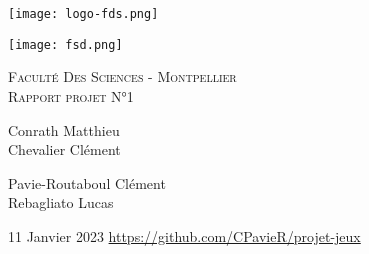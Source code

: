 \documentclass[a4paper, 12pt]{article}
\begin{document}
\begin{titlepage}
  \begin{sffamily}
  \begin{center}
  

\begin{minipage}[c]{.46\linewidth}
     \begin{center}
             \texttt{[image: logo-fds.png]}
         \end{center}
   \end{minipage} \hfill
   \begin{minipage}[c]{.46\linewidth}
    \begin{center}
            \texttt{[image: fsd.png]}
        \end{center}   
 \end{minipage}
 \newline\newline
 
\textsc{\LARGE Faculté Des Sciences - Montpellier}\\[2cm]
\textsc{\Large Rapport projet N°1}\\[2cm]

  \begin{minipage}{0.4\textwidth}
      \begin{flushleft} \large
       Conrath Matthieu\\
        Chevalier Clément\\
      \end{flushleft}
    \end{minipage}
    \begin{minipage}{0.4\textwidth}
      \begin{flushright} \large
        Pavie-Routaboul Clément\\
        Rebagliato Lucas\\
      \end{flushright}
    \end{minipage}

   
    \vfill
    {\large 11 Janvier 2023}
\newline
{\url{https://github.com/CPavieR/projet-jeux}}

  \end{center}
  \end{sffamily}
\end{titlepage}


\renewcommand\contentsname{Sommaire}
\tableofcontents
\newpage
\end{document}
